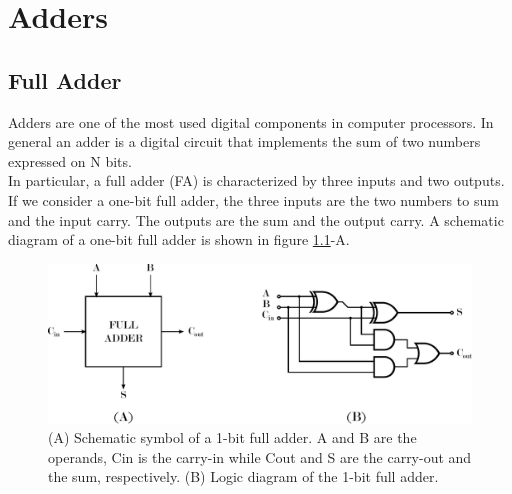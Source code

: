 %
\chapter{Adders}
\label{chap1}



\section{Full Adder}

Adders are one of the most used digital components in computer processors. In general an adder is a digital circuit that implements the sum of two numbers expressed on N bits.\\
In particular, a full adder (FA) is characterized by three inputs and two outputs. If we consider a one-bit full adder, the three inputs are the two numbers to sum and the input carry. The outputs are the sum and the output carry. A schematic diagram of a one-bit full adder is shown in figure \ref{fig:fa}-A. %


	\begin{figure}[ht]
	\centering
	\includegraphics[width=\textwidth]{chapters/figures/fa} 
	\caption{(A) Schematic symbol of a 1-bit full adder. A and B are the operands, Cin is the carry-in while Cout and S are the carry-out and the sum, respectively. (B) Logic diagram of the 1-bit full adder.}
	\label{fig:fa}  %
	\end{figure}

